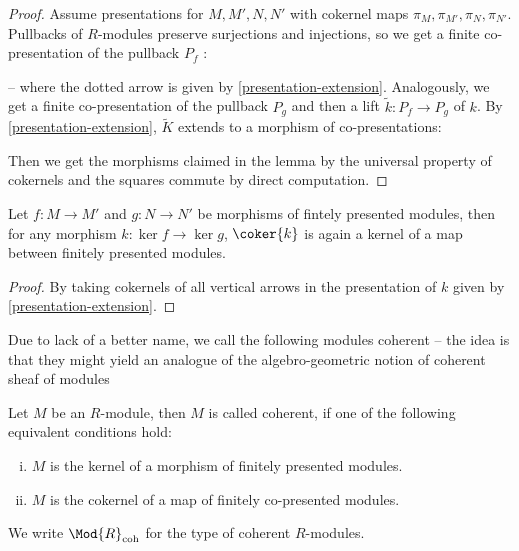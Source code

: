 \begin{proof}
  Assume presentations for $M,M',N,N'$ with cokernel maps $\pi_M,\pi_{M'},\pi_N,\pi_{N'}$.
  Pullbacks of $R$-modules preserve surjections and injections, so we get a finite co-presentation of the pullback $P_f$ :
  \begin{center}
  \end{center}
  -- where the dotted arrow is given by \cref{presentation-extension}.
  Analogously, we get a finite co-presentation of the pullback $P_g$ and then a lift $\tilde{k}:P_f\to P_g$ of $k$.
  By \cref{presentation-extension}, $\tilde{K}$ extends to a morphism of co-presentations:
  \begin{center}
  \end{center}
  Then we get the morphisms claimed in the lemma by the universal property of cokernels and the squares commute by direct computation.
\end{proof}

\begin{lemma}
  \label{cokernel-closure}
  Let $f:M\to M'$ and $g:N\to N'$ be morphisms of fintely presented modules, then for any morphism
  $k:\ker{f}\to \ker{g}$, $\coker{k}$ is again a kernel of a map between finitely presented modules.
\end{lemma}

\begin{proof}
  By taking cokernels of all vertical arrows in the presentation of $k$ given by \cref{presentation-extension}.
\end{proof}

Due to lack of a better name, we call the following modules coherent --
the idea is that they might yield an analogue of the algebro-geometric notion of coherent sheaf of modules

\begin{definition}
  Let $M$ be an $R$-module, then $M$ is called coherent, if one of the following equivalent conditions hold:
  \begin{enumerate}[(i)]
  \item $M$ is the kernel of a morphism of finitely presented modules.
  \item $M$ is the cokernel of a map of finitely co-presented modules.
  \end{enumerate}
  We write $\Mod{R}_{\mathrm{coh}}$ for the type of coherent $R$-modules.
\end{definition}

